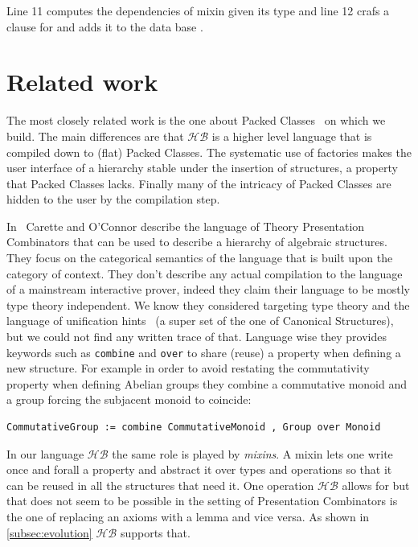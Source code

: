 \documentclass[a4paper,UKenglish,cleveref, autoref]{lipics-v2019}
\newcommand{\HB}{\ensuremath{\mathcal{HB}}}
\newcommand{\mixin}{mixin}
\newcommand{\mixins}{mixins}
\newcommand{\factories}{factories}
\theoremstyle{implem}
\theoremstyle{implem}
\theoremstyle{axiom}
\theoremstyle{abscommand}
\theoremstyle{command}
\begin{document}
{{Line 11 computes the dependencies of \mixin{}  given
its type and line 12 crafs a clause for  and
adds it to the data base .


\section{Related work}
The most closely related work is the one about Packed Classes~\cite{DBLP:conf/tphol/GarillotGMR09} on which we
build. The main differences are that \HB{} is a higher level language
that is compiled down to (flat) Packed Classes. The systematic use of
\factories{} makes the user interface of a hierarchy stable under the insertion of
structures, a property that Packed Classes lacks.
Finally many of the intricacy of Packed Classes are hidden to the user by
the compilation step.

In~\cite{CaretteCombinators} Carette and O'Connor describe the language of
Theory Presentation Combinators that can be used to describe a hierarchy of
algebraic structures.
They focus on the categorical semantics of the language that is built upon
the category of context.
They don't describe any actual compilation to the language of a mainstream
interactive prover, indeed they claim their language to be mostly type theory
independent. We know they considered targeting type theory and the language
of unification hints~\cite{10.1007/978-3-642-03359-9_8}
(a super set of the one of Canonical Structures),
but we could not find any written trace of that. Language wise they provides
keywords such as \verb+combine+ and \verb+over+ to share (reuse) a property
when defining a new structure. For example in order to avoid restating
the commutativity property when defining Abelian groups they combine
a commutative monoid and a group forcing the subjacent monoid to coincide:
\begin{verbatim}
CommutativeGroup := combine CommutativeMonoid , Group over Monoid
\end{verbatim}
In our language \HB{} the same role is played by \emph{\mixins{}}.
A \mixin{} lets one write once and forall a property and abstract it over types
and operations so that it can be reused in all the structures that need it.
One operation \HB{} allows for but that does not seem to be possible in the
setting of Presentation Combinators is the one of replacing an axioms with a
lemma and vice versa. As shown in \autoref{subsec:evolution} \HB{} supports
that.

}}
\end{document}
